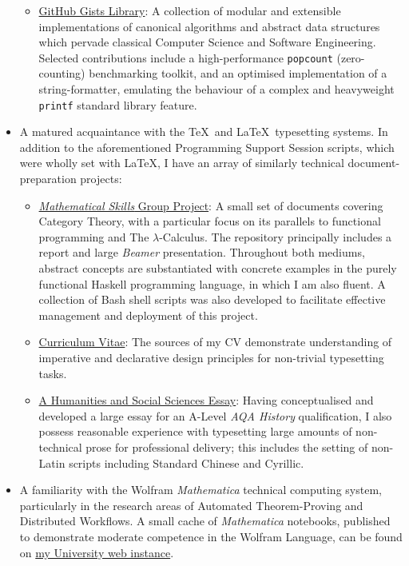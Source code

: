 \documentclass{article}
\newcommand{\githublink}[2]{\href{https://github.com/oliverdixon/#1}{#2}}
\newcommand{\gistlink}[2]{\href{https://gist.github.com/oliverdixon/#1}{#2}}
\newcommand{\weblink}[2]{\href{https://www-users.york.ac.uk/~od641/#1}{#2}}
\begin{document}
\begin{itemize}
\begin{itemize}
                \item \gistlink{}{GitHub Gists Library}: A collection of modular
                and extensible implementations of canonical algorithms and
                abstract data structures which pervade classical Computer
                Science and Software Engineering. Selected contributions
                include a high-performance \texttt{popcount} (zero-counting)
                benchmarking toolkit, and an optimised implementation of a
                string-formatter, emulating the behaviour of a complex and
                heavyweight \texttt{printf} standard library feature.
        \end{itemize}
        \item A matured acquaintance with the \TeX\ and \LaTeX\ typesetting
        systems. In addition to the aforementioned Programming Support Session
        scripts, which were wholly set with \LaTeX, I have an array of similarly
        technical document-preparation projects:
        \begin{itemize}
                \item \githublink{MS1GP}{\textit{Mathematical Skills} Group
                Project}: A small set of documents covering Category Theory,
                with a particular focus on its parallels to functional
                programming and The $\lambda$-Calculus. The repository
                principally includes a report and large \textit{Beamer}
                presentation. Throughout both mediums, abstract concepts are
                substantiated with concrete examples in the purely functional
                Haskell programming language, in which I am also fluent. A
                collection of Bash shell scripts was also developed to
                facilitate effective management and deployment of this project.

                \item \githublink{cv}{Curriculum Vitae}: The sources of my CV
                demonstrate understanding of imperative and declarative design
                principles for non-trivial typesetting tasks.

                \item \githublink{opium}{A Humanities and Social Sciences
                Essay}: Having conceptualised and developed a large essay for an
                A-Level \textit{AQA History} qualification, I also possess
                reasonable experience with typesetting large amounts of
                non-technical prose for professional delivery; this includes the
                setting of non-Latin scripts including Standard Chinese and
                Cyrillic.
        \end{itemize}
        \item A familiarity with the Wolfram \textit{Mathematica} technical
        computing system, particularly in the research areas of Automated
        Theorem-Proving and Distributed Workflows. A small cache of
        \textit{Mathematica} notebooks, published to demonstrate moderate
        competence in the Wolfram Language, can be found on
        \weblink{misc\_mma}{my University web instance}.
\end{itemize}
%
%
\end{document}

